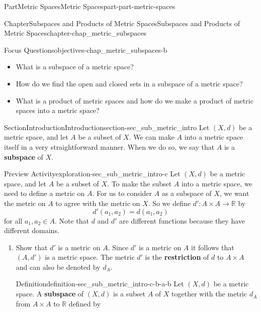 \documentclass[oneside,10pt,]{book}
\newcommand{\terminology}[1]{\textbf{#1}}
\numberwithin{equation}{chapter}
\newcommand{\R}{\mathbb{R}}
\begin{document}
\begin{partptx}{Part}{Metric Spaces}{}{Metric Spaces}{}{}{part-part-metric-spaces}
\begin{chapterptx}{Chapter}{Subspaces and Products of Metric Spaces}{}{Subspaces and Products of Metric Spaces}{}{}{chapter-chap_metric_subspaces}
\renewcommand*{\chaptername}{Chapter}
\begin{objectives}{Focus Questions}{objectives-chap_metric_subspaces-b}
%
\begin{itemize}[label=\textbullet]
\item{}What is a subspace of a metric space?%
\item{}How do we find the open and closed sets in a subspace of a metric space?%
\item{}What is a product of metric spaces and how do we make a product of metric spaces into a metric space?%
\end{itemize}
\end{objectives}
%
%
\typeout{************************************************}
\typeout{************************************************}
%
\begin{sectionptx}{Section}{Introduction}{}{Introduction}{}{}{section-sec_sub_metric_intro}
Let \((X,d)\) be a metric space, and let \(A\) be a subset of \(X\). We can make \(A\) into a metric space itself in a very straightforward manner. When we do so, we say that \(A\) is a \terminology{subspace} of \(X\).%
\begin{exploration}{Preview Activity}{}{exploration-sec_sub_metric_intro-c}%
Let \((X,d)\) be a metric space, and let \(A\) be a subset of \(X\). To make the subset \(A\) into a metric space, we need to define a metric on \(A\). For us to consider \(A\) as a subspace of \(X\), we want the metric on \(A\) to agree with the metric on \(X\). So we define \(d' : A \times A \to \R\) by%
\begin{equation*}
d'(a_1,a_2) = d(a_1,a_2)
\end{equation*}
for all \(a_1, a_2 \in A\). Note that \(d\) and \(d'\) are different functions because they have different domains.%
\begin{enumerate}[font=\bfseries,label=(\alph*),ref=\alph*]%
\item{}Show that \(d'\) is a metric on \(A\). Since \(d'\) is a metric on \(A\) it follows that \((A,d')\) is a metric space. The metric \(d'\) is the \terminology{restriction} of \(d\) to \(A \times A\) and can also be denoted by \(d_A\).%
\begin{definition}{Definition}{}{definition-sec_sub_metric_intro-c-b-a-b}%
%
Let \((X,d)\) be a metric space. A \terminology{subspace} of \((X,d)\) is a subset \(A\) of \(X\) together with the metric \(d_A\) from \(A \times A\) to \(\R\) defined by%
\begin{equation*}

\end{equation*}
\end{definition}
\end{enumerate}
\end{exploration}
\end{sectionptx}
\end{chapterptx}
\end{partptx}
\end{document}
